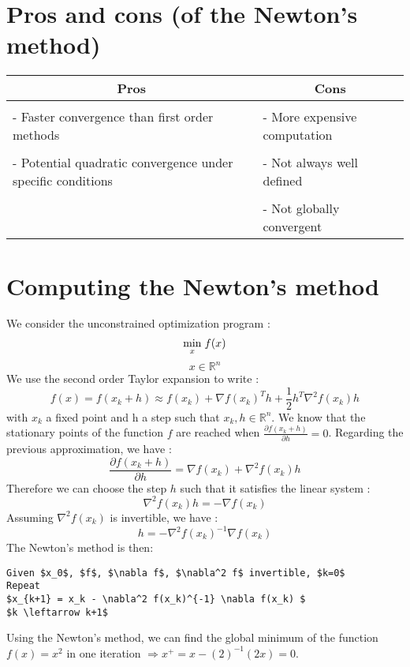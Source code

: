 \section{Pros and cons (of the Newton's method)}
\vspace{0.3cm}
\begin{tabular}{l|l}
\multicolumn{1}{c|}{Pros} & \multicolumn{1}{c}{Cons} \\ 
\hline
 & \\
- Faster convergence than first order methods & - More expensive computation \\
 & \\
- Potential quadratic convergence under specific conditions & - Not always well defined \\
 & \\
 & -  Not globally convergent 
\end{tabular}

\section{Computing the Newton's method}
We consider the unconstrained optimization program :
$$ \underset{x}{\min} \hspace{0.1cm} f(x) $$
$$ x \in \mathbb{R}^n $$
We use the second order Taylor expansion to write :
$$ f(x) = f(x_k + h) \approx f(x_k) + \nabla f(x_k)^T h + \frac{1}{2} h^T\nabla^2 f(x_k) h$$
with $x_k$ a fixed point and h a step such that $x_k,h \in \mathbb{R}^n $. We know that the stationary points of the function $f$ are reached when $\frac{ \partial f(x_k+h)}{\partial h} = 0$. Regarding the previous approximation, we have :
$$\frac{ \partial f(x_k+h)}{\partial h} = \nabla f(x_k) + \nabla^2 f(x_k) h $$
Therefore we can choose the step $h$ such that it satisfies the linear system :
$$\nabla^2 f(x_k) h = -\nabla f(x_k) $$
Assuming $\nabla^2 f(x_k)$ is invertible, we have :
$$ h = -\nabla^2 f(x_k)^{-1} \nabla f(x_k)$$
The Newton's method is then:

\begin{lstlisting}[mathescape,caption=Newton Algorithm]
Given $x_0$, $f$, $\nabla f$, $\nabla^2 f$ invertible, $k=0$
Repeat
$x_{k+1} = x_k - \nabla^2 f(x_k)^{-1} \nabla f(x_k) $
$k \leftarrow k+1$
\end{lstlisting}

\begin{example}
\begin{leftbar} 
Using the Newton's method, we can find the global minimum of the function $f(x) = x^2$ in one iteration $ \Longrightarrow x^+ = x - (2)^{-1}(2x) = 0$.
\end{leftbar}
\end{example}

